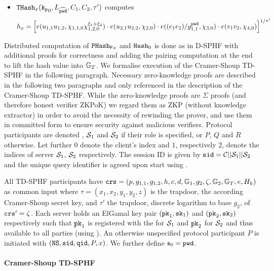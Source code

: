 \begin{itemize}
	\item $\mathtt{THash}_x(\mathtt{k_p}_0, L_{\widehat{\mathtt{pwd}}}, C_1, C_2,\tau')$ computes 
    	\[h_x=\left[ e(u_{1,1} u_{1,2}, \chi_{1,1,0}\chi_{1,2,0}^{\xi_1+\xi_2}) \cdot e(u_{2,1} u_{2,2}, \chi_{2,0}) \cdot e( (e_1 e_2) / g_{1,1}^{\mathtt{pwd}}, \chi_{3,0}) \cdot e( v_{1} v_2, \chi_{4,0})\right]^{1/\tau'}\]
\end{itemize}

\noindent
Distributed computation of $\mathtt{PHash_P}_x$ and $\mathtt{Hash}_0$ is done as in \ac{D-SPHF} with additional proofs for correctness and adding the pairing computation at the end to lift the hash value into $\mathbb{G}_T$.
We formalise execution of the Cramer-Shoup \ac{TD-SPHF} in the following paragraph.
Necessary zero-knowledge proofs are described in the following two paragraphs and only referenced in the description of the Cramer-Shoup \ac{TD-SPHF}.
While the zero-knowledge proofs are $\Sigma$ proofs (and therefore honest verifier \ac{ZKPoK}) we regard them as \ac{ZKP} (without knowledge extractor) in order to avoid the necessity of rewinding the prover, and use them in committed form to ensure security against malicious verifiers.
Protocol participants are denoted \Client, $\mathcal{S}_1$ and $\mathcal{S}_2$ if their role is specified, or $P$, $Q$ and $R$ otherwise.
Let further $0$ denote the client's index and $1$, respectively $2$, denote the indices of server $\mathcal{S}_1$, $\mathcal{S}_2$ respectively.
The session ID is given by $\mathtt{sid}=\mathcal{C}||\mathcal{S}_1||\mathcal{S}_2$ and the unique query identifier \qid is agreed upon start using \Finit.

All \ac{TD-SPHF} participants have $\mathtt{crs}=(p,g_{1,1},g_{1,2},h,c,d,\mathbb{G}_1,g_{2},\zeta,\mathbb{G}_2,\mathbb{G}_T,e,H_k)$ as common input where $\tau=(x_1,x_2,y_1,y_2,z)$ is the \crs trapdoor, \ie the according Cramer-Shoup secret key, and $\tau'$ the trapdoor, \ie discrete logarithm to base $g_2$, of $\mathtt{crs}'=\zeta$.
Each server holds an ElGamal key pair $(\mathtt{pk}_1, \mathtt{sk}_1)$ and $(\mathtt{pk}_2, \mathtt{sk}_2)$ respectively such that $\mathtt{pk}_1$ is registered with the \CA for $\mathcal{S}_1$ and $\mathtt{pk}_2$ for $\mathcal{S}_2$ and thus available to all parties (using \Fca).
An otherwise unspecified protocol participant $P$ is initiated with $(\mathtt{NS}, \mathtt{sid}, \mathtt{qid}, P, x)$.
We further define $\mathfrak{s}_0=\mathtt{pwd}$.

\paragraph{Cramer-Shoup TD-SPHF}

